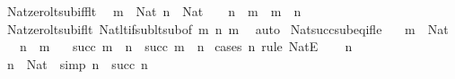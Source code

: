 \begin{isabellebody}
\isamarkupfalse%
%
\endisatagproof
{\isafoldproof}%
%
\isadelimproof
\isanewline
%
\endisadelimproof
\isanewline
{}\isamarkupfalse%
\ Nat{\isacharunderscore}{\kern0pt}zero{\isacharunderscore}{\kern0pt}lt{\isacharunderscore}{\kern0pt}sub{\isacharunderscore}{\kern0pt}iff{\isacharunderscore}{\kern0pt}lt{\isacharcolon}{\kern0pt}\isanewline
\ \ {\isachardoublequoteopen}{\isasymlbrakk}m\ {\isacharcolon}{\kern0pt}\ Nat{\isacharsemicolon}{\kern0pt}\ n\ {\isacharcolon}{\kern0pt}\ Nat{\isasymrbrakk}\ {\isasymLongrightarrow}\ {}\ {\isacharless}{\kern0pt}\ n\ {\isacharminus}{\kern0pt}\ m\ {\isasymlongleftrightarrow}\ m\ {\isacharless}{\kern0pt}\ n{\isachardoublequoteclose}\isanewline
%
\isadelimproof
\ \ %
\endisadelimproof
%
\isatagproof
{}\isamarkupfalse%
\ Nat{\isacharunderscore}{\kern0pt}zero{\isacharunderscore}{\kern0pt}lt{\isacharunderscore}{\kern0pt}sub{\isacharunderscore}{\kern0pt}if{\isacharunderscore}{\kern0pt}lt\ Nat{\isacharunderscore}{\kern0pt}lt{\isacharunderscore}{\kern0pt}if{\isacharunderscore}{\kern0pt}sub{\isacharunderscore}{\kern0pt}lt{\isacharunderscore}{\kern0pt}sub{\isacharbrackleft}{\kern0pt}of\ m\ n\ m{\isacharbrackright}{\kern0pt}\ \isamarkupfalse%
\ auto%
\endisatagproof
{\isafoldproof}%
%
\isadelimproof
\isanewline
%
\endisadelimproof
\isanewline
{}\isamarkupfalse%
\ Nat{\isacharunderscore}{\kern0pt}succ{\isacharunderscore}{\kern0pt}sub{\isacharunderscore}{\kern0pt}eq{\isacharunderscore}{\kern0pt}if{\isacharunderscore}{\kern0pt}le{\isacharcolon}{\kern0pt}\isanewline
\ \ \ {\isachardoublequoteopen}m\ {\isacharcolon}{\kern0pt}\ Nat{\isachardoublequoteclose}\isanewline
\ \ \ {\isachardoublequoteopen}n\ {\isasymle}\ m{\isachardoublequoteclose}\isanewline
\ \ \ {\isachardoublequoteopen}succ\ m\ {\isacharminus}{\kern0pt}\ n\ {\isacharequal}{\kern0pt}\ succ\ {\isacharparenleft}{\kern0pt}m\ {\isacharminus}{\kern0pt}\ n{\isacharparenright}{\kern0pt}{\isachardoublequoteclose}\isanewline
%
\isadelimproof
%
\endisadelimproof
%
\isatagproof
{}\isamarkupfalse%
\ {\isacharparenleft}{\kern0pt}cases\ n\ rule{\isacharcolon}{\kern0pt}\ NatE{\isacharparenright}{\kern0pt}\isanewline
\ \ \isamarkupfalse%
\ n{\isacharprime}{\kern0pt}\ \isamarkupfalse%
\ {\isachardoublequoteopen}n{\isacharprime}{\kern0pt}\ {\isacharcolon}{\kern0pt}\ Nat{\isachardoublequoteclose}\ \ {\isacharbrackleft}{\kern0pt}simp{\isacharbrackright}{\kern0pt}{\isacharcolon}{\kern0pt}\ {\isachardoublequoteopen}n\ {\isacharequal}{\kern0pt}\ succ\ n{\isacharprime}{\kern0pt}{\isachardoublequoteclose}\isanewline

\end{isabellebody}
